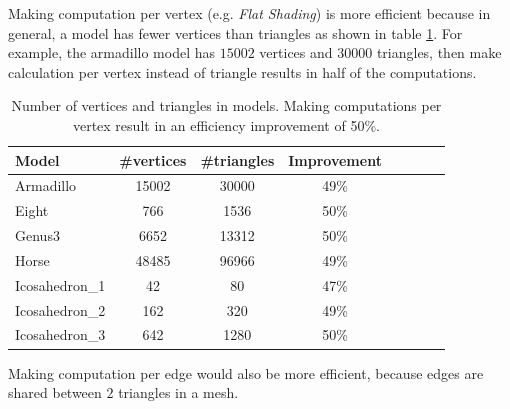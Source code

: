 Making computation per vertex (e.g. \textit{Flat Shading}) is more efficient because in general, a model has fewer vertices than triangles as shown in table \ref{table:model-table-vertices}.
For example, the armadillo model has $15002$ vertices and $30000$ triangles, then make calculation per vertex instead of triangle results in half of the computations.

\begin{table}[!h]
    \centering
\begin{tabular}{l*{6}{c}r}
    \centering
    Model              & \#vertices & \#triangles & Improvement\\
    \hline
    Armadillo          & 15002 & 30000 & 49\%\\
    Eight              & 766 & 1536 & 50\% \\
    Genus3             & 6652 & 13312 & 50\% \\
    Horse              & 48485 &  96966 & 49\%\\
    Icosahedron\_1      &  42 & 80 & 47\%\\
    Icosahedron\_2      &  162 & 320 & 49\% \\
    Icosahedron\_3      & 642 &  1280 & 50\%
\end{tabular}
\caption{Number of vertices and triangles in models. Making computations per vertex result in an efficiency improvement of 50\%.}
\label{table:model-table-vertices}
\end{table}

Making computation per edge would also be more efficient, because edges are shared between $2$ triangles in a mesh.

